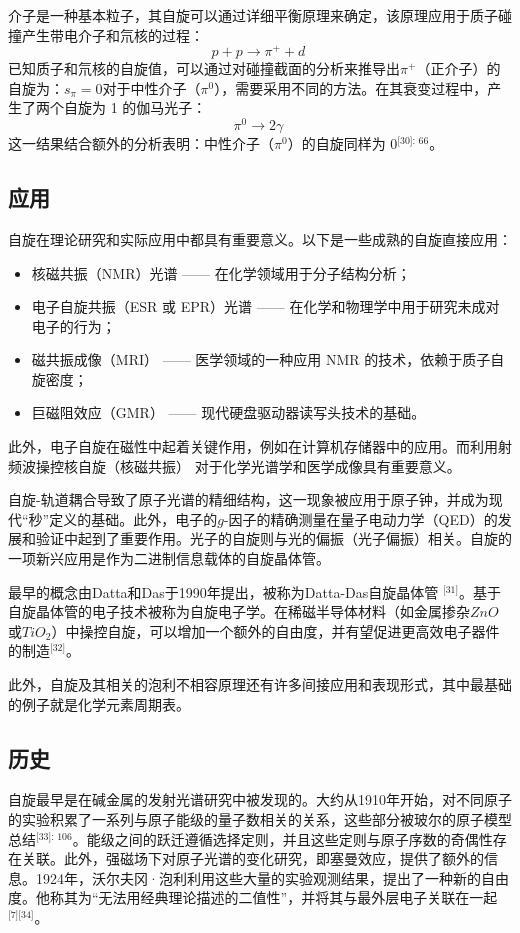 介子是一种基本粒子，其自旋可以通过详细平衡原理来确定，该原理应用于质子碰撞产生带电介子和氘核的过程：
\[
p + p \rightarrow \pi^+ + d~
\]
已知质子和氘核的自旋值，可以通过对碰撞截面的分析来推导出\(\pi^+\)（正介子）的自旋为：\(s_{\pi} = 0\)对于中性介子（\(\pi^0\)），需要采用不同的方法。在其衰变过程中，产生了两个自旋为 1 的伽马光子：
\[
\pi^0 \rightarrow 2\gamma~
\]
这一结果结合额外的分析表明：中性介子（\(\pi^0\)）的自旋同样为 0\(^\text{[30]: 66}\)。
\subsection{应用} 
自旋在理论研究和实际应用中都具有重要意义。以下是一些成熟的自旋直接应用：  
\begin{itemize}
\item 核磁共振（NMR）光谱 —— 在化学领域用于分子结构分析；  
\item 电子自旋共振（ESR 或 EPR）光谱 —— 在化学和物理学中用于研究未成对电子的行为；  
\item 磁共振成像（MRI） —— 医学领域的一种应用 NMR 的技术，依赖于质子自旋密度；  
\item 巨磁阻效应（GMR） —— 现代硬盘驱动器读写头技术的基础。  
\end{itemize}
此外，电子自旋在磁性中起着关键作用，例如在计算机存储器中的应用。而利用射频波操控核自旋（核磁共振） 对于化学光谱学和医学成像具有重要意义。

自旋-轨道耦合导致了原子光谱的精细结构，这一现象被应用于原子钟，并成为现代“秒”定义的基础。此外，电子的\(g\)-因子的精确测量在量子电动力学（QED）的发展和验证中起到了重要作用。光子的自旋则与光的偏振（光子偏振）相关。自旋的一项新兴应用是作为二进制信息载体的自旋晶体管。

最早的概念由Datta和Das于1990年提出，被称为Datta-Das自旋晶体管 \(^\text{[31]}\)。基于自旋晶体管的电子技术被称为自旋电子学。在稀磁半导体材料（如金属掺杂\(ZnO\)或\(TiO_2\)）中操控自旋，可以增加一个额外的自由度，并有望促进更高效电子器件的制造\(^\text{[32]}\)。  

此外，自旋及其相关的泡利不相容原理还有许多间接应用和表现形式，其中最基础的例子就是化学元素周期表。
\subsection{历史}
自旋最早是在碱金属的发射光谱研究中被发现的。大约从1910年开始，对不同原子的实验积累了一系列与原子能级的量子数相关的关系，这些部分被玻尔的原子模型总结\(^\text{[33]: 106}\)。能级之间的跃迁遵循选择定则，并且这些定则与原子序数的奇偶性存在关联。此外，强磁场下对原子光谱的变化研究，即塞曼效应，提供了额外的信息。1924年，沃尔夫冈·泡利利用这些大量的实验观测结果，提出了一种新的自由度。他称其为“无法用经典理论描述的二值性”，并将其与最外层电子关联在一起 \(^\text{[7][34]}\)。


